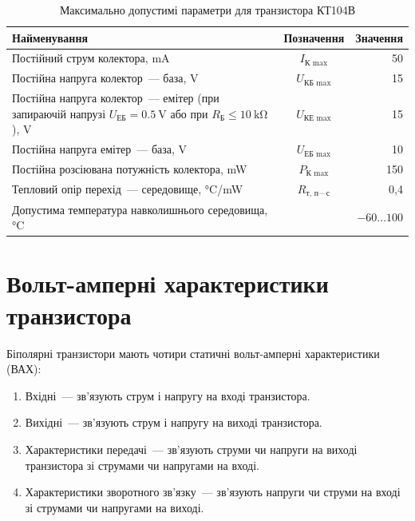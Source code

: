 \documentclass[14pt,ukrainian,utf8,simple]{eskdtext}
\let\stdsection\section
\renewcommand\section{\newpage\stdsection}
\begin{document}
		\begin{longtable}[c]{|x{0.5\textwidth}|c|r|}
			\hline
				Найменування & Позначення & Значення \\
			\hline
			\endhead
			\caption{Максимально допустимі параметри для транзистора КТ104В}
			\label{tab:ktmaxparams}
			\endfoot
			
				Постійний струм колектора, \si{\milli\ampere} & $I_{\text{К max}}$ & 50 \\
				\hline
				Постійна напруга колектор~— база, \si{\volt}        & $U_{\text{КБ max}}$ & 15 \\
				\hline
				Постійна напруга колектор~— емітер (при запираючій напрузі $U_{\text{ЕБ}} = \SI{0,5}{\volt}$ або при $R_{\text{Б}} \leqslant \SI{10}{\kilo\ohm}$), \si{\volt} & $U_{\text{КЕ max}}$ & 15 \\
				\hline
				Постійна напруга емітер~— база, \si{\volt} & $U_{\text{ЕБ max}}$ & 10 \\
				\hline
				Постійна розсіювана потужність колектора, \si{\milli\watt} & $P_{\text{К max}}$ & 150 \\
				\hline
				Тепловий опір перехід~— середовище, \si[per-mode = symbol, bracket-unit-denominator = false]{\celsius\per\milli\watt} & $R_{\text{т, п—с}}$ & 0{,}4 \\
				\hline
				Допустима температура навколишнього середовища, \si{\celsius} & & $\num{-60} \ldots \num{+100}$ \\
			\hline
		\end{longtable}
			
	\section*{Вольт-амперні характеристики транзистора}
		Біполярні транзистори мають чотири статичні вольт-амперні характеристики (ВАХ):
		\begin{enumerate}[label=\arabic*.]
			\item Вхідні~— зв'язують струм і напругу на вході транзистора.
			\item Вихідні~— зв'язують струм і напругу на виході транзистора.
			\item Характеристики передачі~— зв'язують струми чи напруги на виході транзистора зі струмами чи напругами на вході.
			\item Характеристики зворотного зв'язку~— зв'язують напруги чи струми на вході зі струмами чи напругами на виході.
		\end{enumerate}
		
\end{document}
